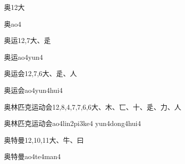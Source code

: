 \begin{entry}{奥}{12}{⼤}
  \begin{phonetics}{奥}{ao4}
  \end{phonetics}
\end{entry}

\begin{entry}{奥运}{12,7}{⼤、⾡}
  \begin{phonetics}{奥运}{ao4yun4}
  \end{phonetics}
\end{entry}

\begin{entry}{奥运会}{12,7,6}{⼤、⾡、⼈}
  \begin{phonetics}{奥运会}{ao4yun4hui4}
  \end{phonetics}
\end{entry}

\begin{entry}{奥林匹克运动会}{12,8,4,7,7,6,6}{⼤、⽊、⼖、⼗、⾡、⼒、⼈}
  \begin{phonetics}{奥林匹克运动会}{ao4lin2pi3ke4 yun4dong4hui4}
  \end{phonetics}
\end{entry}

\begin{entry}{奥特曼}{12,10,11}{⼤、⽜、⽈}
  \begin{phonetics}{奥特曼}{ao4te4man4}
  \end{phonetics}
\end{entry}


